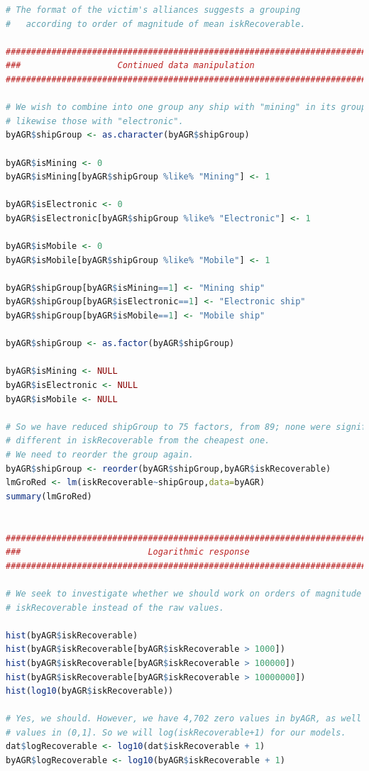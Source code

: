\documentclass[letterpaper,12pt,article]{memoir}
\begin{document}
{\begin{lstlisting}[language=R]
# The format of the victim's alliances suggests a grouping
#   according to order of magnitude of mean iskRecoverable.

###############################################################################
###                   Continued data manipulation                           ###
###############################################################################

# We wish to combine into one group any ship with "mining" in its group name;
# likewise those with "electronic".
byAGR$shipGroup <- as.character(byAGR$shipGroup)

byAGR$isMining <- 0
byAGR$isMining[byAGR$shipGroup %like% "Mining"] <- 1

byAGR$isElectronic <- 0
byAGR$isElectronic[byAGR$shipGroup %like% "Electronic"] <- 1

byAGR$isMobile <- 0
byAGR$isMobile[byAGR$shipGroup %like% "Mobile"] <- 1

byAGR$shipGroup[byAGR$isMining==1] <- "Mining ship"
byAGR$shipGroup[byAGR$isElectronic==1] <- "Electronic ship"
byAGR$shipGroup[byAGR$isMobile==1] <- "Mobile ship"

byAGR$shipGroup <- as.factor(byAGR$shipGroup)

byAGR$isMining <- NULL
byAGR$isElectronic <- NULL
byAGR$isMobile <- NULL

# So we have reduced shipGroup to 75 factors, from 89; none were significantly
# different in iskRecoverable from the cheapest one.
# We need to reorder the group again.
byAGR$shipGroup <- reorder(byAGR$shipGroup,byAGR$iskRecoverable)
lmGroRed <- lm(iskRecoverable~shipGroup,data=byAGR)
summary(lmGroRed)


###############################################################################
###                         Logarithmic response                            ###
###############################################################################

# We seek to investigate whether we should work on orders of magnitude of
# iskRecoverable instead of the raw values. 

hist(byAGR$iskRecoverable)
hist(byAGR$iskRecoverable[byAGR$iskRecoverable > 1000])
hist(byAGR$iskRecoverable[byAGR$iskRecoverable > 100000])
hist(byAGR$iskRecoverable[byAGR$iskRecoverable > 10000000])
hist(log10(byAGR$iskRecoverable))

# Yes, we should. However, we have 4,702 zero values in byAGR, as well as some
# values in (0,1]. So we will log(iskRecoverable+1) for our models.
dat$logRecoverable <- log10(dat$iskRecoverable + 1)
byAGR$logRecoverable <- log10(byAGR$iskRecoverable + 1)


\end{lstlisting}}
\end{document}
